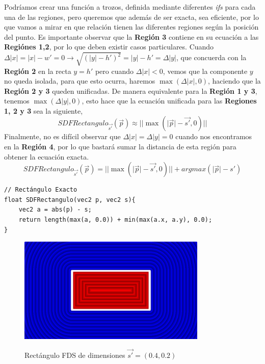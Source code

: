 Podríamos crear una función a trozos, definida mediante diferentes \textit{ifs} para cada una de las regiones, pero queremos que además de ser exacta, sea eficiente, por lo que vamos a mirar en que relación tienen las diferentes regiones según la posición del punto. Es importante observar que la \textbf{Región 3} contiene en su ecuación a las \textbf{Regiónes 1,2}, por lo que deben existir casos particulares. Cuando \(\Delta \vert x\vert =\vert x\vert-w'=0\longrightarrow \sqrt{\left(\vert y\vert-h'\right)^2} = \vert y\vert-h'=\Delta \vert y\vert\), que concuerda con la \textbf{Región 2} en la recta \(y=h'\) pero cuando \(\Delta \vert x\vert < 0\), vemos que la componente \(y\) no queda isolada, para que esto ocurra, haremos \(\max\left(\Delta \vert x\vert, 0\right)\), haciendo que la \textbf{Región 2 y 3} queden unificadas. De manera equivalente para la \textbf{Región 1 y 3}, tenemos \(\max\left(\Delta \vert y\vert, 0\right)\), esto hace que la ecuación unificada para las \textbf{Regiones 1, 2 y 3} sea la siguiente,
\[SDFRectangulo_{\Vec{s'}}(\Vec{p})\approx \vert\vert\max\left(\vert\Vec{p}\vert-\Vec{s'},0\right)\vert\vert\]
Finalmente, no es difícil observar que \(\Delta\vert x\vert=\Delta\vert y\vert=0\) cuando nos encontramos en la \textbf{Región 4}, por lo que bastará sumar la distancia de esta región para obtener la ecuación exacta.
\[SDFRectangulo_{\Vec{s'}}(\Vec{p})= \vert\vert\max\left(\vert\Vec{p}\vert-\Vec{s'},0\right)\vert\vert + argmax(\vert \Vec{p}\vert - {s'})\]
\begin{lstlisting}
// Rectángulo Exacto
float SDFRectangulo(vec2 p, vec2 s){
    vec2 a = abs(p) - s;
    return length(max(a, 0.0)) + min(max(a.x, a.y), 0.0);
}
\end{lstlisting}
\begin{figure}[H]
  \centering
  \captionsetup{justification=centering}%
  \includegraphics[width=0.8\textwidth]{secciones/imagenes/sdf/2d/sdf_rectangulo.png}\label{fig:rectaangulo}
  \caption{Rectángulo FDS de dimensiones \(\Vec{s'}=(0.4, 0.2)\)}
\end{figure}

